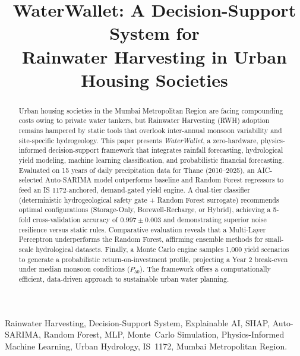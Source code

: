 \documentclass[conference]{IEEEtran}
\begin{document}
\title{WaterWallet: A Decision-Support System for\\
Rainwater Harvesting in Urban Housing Societies}

\author{
}

\maketitle

\begin{abstract}
Urban housing societies in the Mumbai Metropolitan Region are facing compounding costs owing to private water tankers, but Rainwater Harvesting (RWH) adoption remains hampered by static tools that overlook inter-annual monsoon variability and site-specific hydrogeology. This paper presents \textit{WaterWallet}, a zero-hardware, physics-informed decision-support framework that integrates rainfall forecasting, hydrological yield modeling, machine learning classification, and probabilistic financial forecasting. Evaluated on 15 years of daily precipitation data for Thane (2010--2025), an AIC-selected Auto-SARIMA model outperforms baseline and Random Forest regressors to feed an IS 1172-anchored, demand-gated yield engine. A dual-tier classifier (deterministic hydrogeological safety gate + Random Forest surrogate) recommends optimal configurations (Storage-Only, Borewell-Recharge, or Hybrid), achieving a 5-fold cross-validation accuracy of $0.997 \pm 0.003$ and demonstrating superior noise resilience versus static rules. Comparative evaluation reveals that a Multi-Layer Perceptron underperforms the Random Forest, affirming ensemble methods for small-scale hydrological datasets. Finally, a Monte Carlo engine samples 1,000 yield scenarios to generate a probabilistic return-on-investment profile, projecting a Year 2 break-even under median monsoon conditions ($P_{50}$). The framework offers a computationally efficient, data-driven approach to sustainable urban water planning.
\end{abstract}

\begin{IEEEkeywords}
Rainwater Harvesting, Decision-Support System, Explainable AI, SHAP,
Auto-SARIMA, Random Forest, MLP, Monte~Carlo Simulation,
Physics-Informed Machine Learning, Urban Hydrology, IS~1172,
Mumbai Metropolitan Region.
\end{IEEEkeywords}
\end{document}
